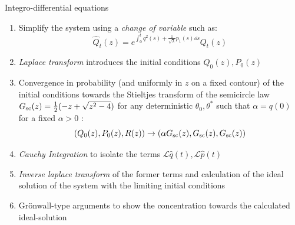 \documentclass[10pt]{beamer}
\begin{document}
\begin{frame}{Integro-differential equations}
  \begin{enumerate}
      \item Simplify the system using a \emph{change of variable} such as:
      \begin{equation}
          \hat Q_t(z) = e^{\int_0^t q^2(s) + \frac{1}{\sqrt \lambda} p_1(s) \dd s} Q_t(z)
      \end{equation}
      \item \emph{Laplace transform} introduces the initial conditions $Q_0(z), P_0(z)$
      \item Convergence in probability (and uniformly in $z$ on a fixed contour) of the initial conditions towards the Stieltjes transform of the semicircle law $G_{\rm sc}(z) = \frac12(-z + \sqrt{z^2 - 4})$ for any deterministic $\theta_0, \theta^*$ such that $\alpha = q(0)$ for a fixed $\alpha > 0$ :
      \begin{equation}
          (Q_0(z), P_0(z), R(z)) \to (\alpha G_{\rm sc}(z), G_{\rm sc}(z), G_{\rm sc}(z))
      \end{equation}
      \item \emph{Cauchy Integration} to isolate the terms $\mathcal L \hat q(t), \mathcal L \hat p(t)$ 
      \item \emph{Inverse laplace transform} of the former terms and calculation of the ideal solution of the system with the limiting initial conditions
      \item Grönwall-type arguments to show the concentration towards the calculated ideal-solution
  \end{enumerate}
\end{frame}
\end{document}
